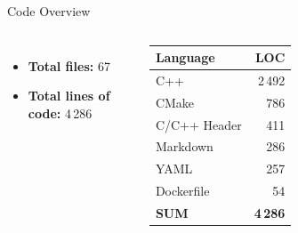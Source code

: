     \begin{frame}{Code Overview}
        \small
        \begin{columns}
                \begin{itemize}
                    \item \textbf{Total files:} 67
                    \item \textbf{Total lines of code:} 4\,286
                \end{itemize}

                \begin{tabular}{@{}l r@{}}
                \textbf{Language} & \textbf{LOC} \\\hline
                C++ & 2\,492 \\
                CMake & 786 \\
                C/C++ Header & 411 \\
                Markdown & 286 \\
                YAML & 257 \\
                Dockerfile & 54 \\\hline
                \textbf{SUM} & \textbf{4\,286}
                \end{tabular}
        \end{columns}
    \end{frame}
